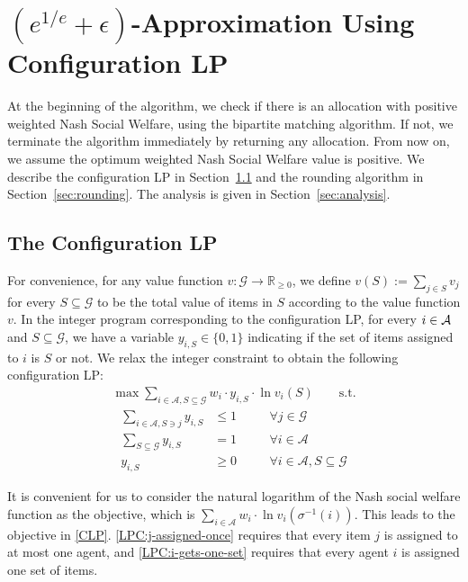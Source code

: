 \documentclass[10pt,a4paper]{article}
\theoremstyle{definition}
\theoremstyle{plain}
\newcommand\calA{{\mathcal{A}}}
\newcommand\calG{{\mathcal{G}}}
\newcommand{\R}{{\mathbb{R}}}
\begin{document}
\section{\texorpdfstring{$(e^{1/e} + \epsilon)$}{e to the 1/e + epsilon}-Approximation Using Configuration LP}
At the beginning of the algorithm, we check if there is an allocation with positive weighted Nash Social Welfare, using the bipartite matching algorithm. If not, we terminate the algorithm immediately by returning any allocation. From now on, we assume the optimum weighted Nash Social Welfare value is positive.  We describe the configuration LP in Section~\ref{sec:LP} and the rounding algorithm in Section~\ref{sec:rounding}. The analysis is given in Section~\ref{sec:analysis}.

\subsection{The Configuration LP} \label{sec:LP}

For convenience, for any value function $v: \calG \to \R_{\geq 0}$, we define $v(S):= \sum_{j \in S}v_j$ for every $S \subseteq \calG$ to be the total value of items in $S$ according to the value function $v$. In the integer program corresponding to the configuration LP, for every $i \in \cal A$ and $S \subseteq \calG$, we have a variable $y_{i, S} \in \{0, 1\}$ indicating if the set of items assigned to $i$ is $S$ or not. We relax the integer constraint to obtain the following configuration LP: 
\begin{align}
    \max \sum_{i \in \calA, S \subseteq  \calG} w_i \cdot y_{i, S} \cdot \ln v_i(S) \qquad \text{s.t.} \tag{Conf-LP}\label{CLP}
\end{align} \vspace*{-10pt}
\begin{align}
    \sum_{i \in \calA, S \ni j} y_{i, S} &\leq 1 &\quad &\forall j \in \calG \label{LPC:j-assigned-once}\\
    \sum_{S \subseteq \calG} y_{i, S} &= 1 &\quad &\forall i \in \calA \label{LPC:i-gets-one-set}\\
    y_{i, S} &\geq 0 &\quad &\forall i \in \calA, S\subseteq \calG
\end{align}

It is convenient for us to consider the natural logarithm of the Nash social welfare function as the objective, which is $\sum_{i \in \calA} w_i \cdot \ln v_i (\sigma^{-1}(i))$. This leads to the objective in \eqref{CLP}.  \eqref{LPC:j-assigned-once} requires that every item $j$ is assigned to at most one agent, and \eqref{LPC:i-gets-one-set} requires that every agent $i$ is assigned one set of items. 
\end{document}
